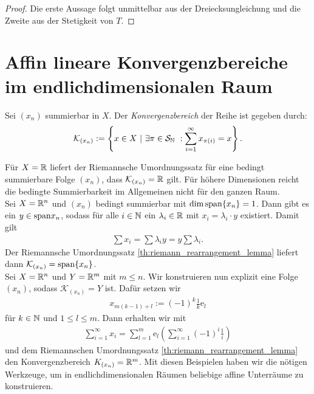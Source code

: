 \begin{proof}
	Die erste Aussage folgt unmittelbar aus der Dreiecksungleichung und die Zweite aus der Stetigkeit von $ T $.
\end{proof}



\section{Affin lineare Konvergenzbereiche im endlichdimensionalen Raum}\label{sc:construction_steiniz_prop_finite}


\begin{df}
	Sei $ (x_n) $ summierbar in $ X $.
	Der \textit{Konvergenzbereich} der Reihe ist gegeben durch:
	\begin{align*}
		\mathcal{K}_{(x_n) }:= 
		\left\{
		x \in X \ | \ \exists \pi \in \mathcal{S}_{\mathbb{N}}\ : \sum \limits_{i=1}^\infty x_{\pi(i)} = x
		\right\}.
	\end{align*}
\end{df}

Für $ X = \mathbb{R} $ liefert der Riemannsche Umordnungssatz für eine bedingt summierbare Folge $ (x_n) $, dass $ \mathcal{K}_{(x_n)} = \mathbb{R} $ gilt.
Für höhere Dimensionen reicht die bedingte Summierbarkeit im Allgemeinen nicht für den ganzen Raum. \\
Sei $ X = \mathbb{R}^n $ und $ (x_n) $ bedingt summierbar mit $  \dim  \mathrm{span}\{x_n\} =1 $.
Dann gibt es ein $ y \in \mathrm{span} {x_n} $, sodass für alle $ i \in \mathbb{N} $ ein $ \lambda_i \in \mathbb{R} $ mit $ x_i = \lambda_i \cdot y $ existiert.
Damit gilt
\begin{align*}
	\sum x_i = \sum \lambda_i y = y \sum \lambda_i.
\end{align*}
Der Riemannsche Umordnungssatz \ref{th:riemann_rearrangement_lemma} liefert dann $ \mathcal{K}_{(x_n )} = \mathrm{span}\{x_n\} $.\\
Sei $ X = \mathbb{R}^n  $ und $ Y=\mathbb{R}^m $ mit $ m \leq n $.
Wir konstruieren nun explizit eine Folge $ (x_n)$, sodass $ \mathcal{K}_{(x_n)} = Y $ ist.
Dafür setzen wir
\begin{align*}
	x_{m(k-1)+ l}  := (-1)^k \frac{1}{k} \mathrm{e}_l
\end{align*}
für $ k \in \mathbb{N} $ und $ 1 \leq l \leq m $.
Dann erhalten wir mit
\begin{align*}
	\sum \limits_{i=1}^\infty x_i
	=
	\sum \limits_{l=1}^m  \mathrm{e}_l \left(\sum \limits_{i = 1}^\infty (-1)^i \frac{1}{i} \right) 
\end{align*}
und dem Riemannschen Umordnungssatz \ref{th:riemann_rearrangement_lemma} den Konvergenzbereich $ K_{(x_n)} = \mathbb{R}^m$.
Mit diesen Beispielen haben wir die nötigen Werkzeuge, um in endlichdimensionalen Räumen beliebige affine Unterräume zu konstruieren.


